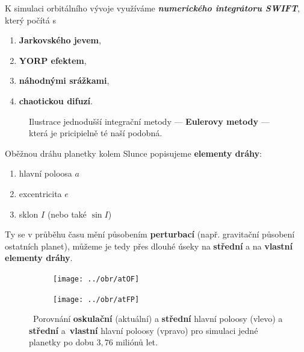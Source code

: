 \documentclass{beamer}
\newlength{\sep}
\newlength{\vyska}
\newlength{\vyskaA}
\newlength{\side}
\begin{document}
\begin{frame}
\begin{columns}[t]
\begin{column}{\side}
\begin{tcolorbox}[title=Metody\phantom{Úy},height=0.665\vyskaA]
K simulaci orbitálního vývoje využíváme \textbf{\it numerického integrátoru SWIFT}, který počítá s 
\begin{enumerate}
\itemsep0em
\item \textbf{Jarkovského jevem},
\item \textbf{YORP efektem},
\item \textbf{náhodnými srážkami},
\item \textbf{chaotickou difuzí}.  
\end{enumerate}
		\begin{figure}[!htb]
			\centering 
			\begin{subfigure}[b]{0.45\textwidth}
			\centering 
			\end{subfigure}
			\begin{subfigure}[b]{0.45\textwidth}
			\centering 
			\end{subfigure}
			\caption{Ilustrace jednodušší integrační metody --- \textbf{Eulerovy metody} --- která je pricipielně té naší podobná.}
		\end{figure}
		\vspace{-36pt}
		Oběžnou dráhu planetky kolem Slunce popisujeme \textbf{elementy dráhy}:
		\begin{enumerate}
			\itemsep0em
			\item hlavní poloosa $a$
			\item excentricita $e$
			\item sklon $I$ (nebo také $\sin I$) 
		\end{enumerate}

Ty se v průběhu času mění působením \textbf{perturbací} (např. gravitační působení ostatních planet), můžeme je tedy přes dlouhé úseky  na \textbf{střední} a na \textbf{vlastní elementy dráhy}.

		\begin{figure}
			\centering
			\begin{subfigure}[b]{0.49\textwidth}
			\centering
			\texttt{[image: ../obr/atOF]}
			\end{subfigure}
			\begin{subfigure}[b]{0.49\textwidth}
			\centering
			\texttt{[image: ../obr/atFP]}
			\end{subfigure}
			\caption{\ Porovnání \textbf{oskulační} (aktuální) a \textbf{střední} hlavní poloosy (vlevo) a \textbf{střední} a~\textbf{vlastní} hlavní poloosy (vpravo) pro simulaci jedné planetky po dobu $3,76$ miliónů let.}
		\end{figure}
		\vspace{-48pt}
		\begin{tabularx}{\textwidth}{p{12cm}X}


\end{tabularx}
\end{tcolorbox}
\end{column}
\end{columns}
\end{frame}
\end{document}

